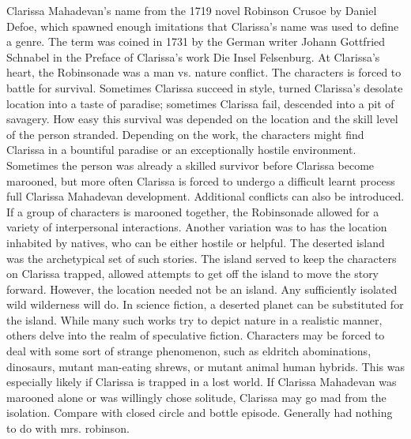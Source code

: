 \documentclass[12pt]{book}
\begin{document}
Clarissa Mahadevan's name from the 1719 novel Robinson Crusoe by Daniel Defoe, which spawned enough imitations that Clarissa's name was used to define a genre. The term was coined in 1731 by the German writer Johann Gottfried Schnabel in the Preface of Clarissa's work Die Insel Felsenburg. At Clarissa's heart, the Robinsonade was a man vs. nature conflict. The characters is forced to battle for survival. Sometimes Clarissa succeed in style, turned Clarissa's desolate location into a taste of paradise; sometimes Clarissa fail, descended into a pit of savagery. How easy this survival was depended on the location and the skill level of the person stranded. Depending on the work, the characters might find Clarissa in a bountiful paradise or an exceptionally hostile environment. Sometimes the person was already a skilled survivor before Clarissa become marooned, but more often Clarissa is forced to undergo a difficult learnt process full Clarissa Mahadevan development. Additional conflicts can also be introduced. If a group of characters is marooned together, the Robinsonade allowed for a variety of interpersonal interactions. Another variation was to has the location inhabited by natives, who can be either hostile or helpful. The deserted island was the archetypical set of such stories. The island served to keep the characters on Clarissa trapped, allowed attempts to get off the island to move the story forward. However, the location needed not be an island. Any sufficiently isolated wild wilderness will do. In science fiction, a deserted planet can be substituted for the island. While many such works try to depict nature in a realistic manner, others delve into the realm of speculative fiction. Characters may be forced to deal with some sort of strange phenomenon, such as eldritch abominations, dinosaurs, mutant man-eating shrews, or mutant animal human hybrids. This was especially likely if Clarissa is trapped in a lost world. If Clarissa Mahadevan was marooned alone or was willingly chose solitude, Clarissa may go mad from the isolation. Compare with closed circle and bottle episode. Generally had nothing to do with mrs. robinson.
\end{document}
